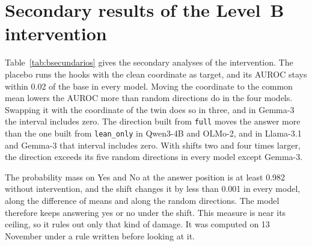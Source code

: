 \documentclass[10pt]{article}
\newcommand{\vr}[1]{\texttt{#1}}
\begin{document}
\section{Secondary results of the Level~B intervention}\label{app:intervencion}

Table~\ref{tab:bsecundarios} gives the secondary analyses of the intervention. The placebo runs the hooks with the
clean coordinate as target, and its AUROC stays within 0.02 of the base in every model. Moving the coordinate to the
common mean lowers the AUROC more than random directions do in the four models. Swapping it with the coordinate of the
twin does so in three, and in Gemma-3 the interval includes zero. The direction built from \vr{full} moves the answer
more than the one built from \vr{lean\_only} in Qwen3-4B and OLMo-2, and in Llama-3.1 and Gemma-3 that interval
includes zero. With shifts two and four times larger, the direction exceeds its five random directions in every model
except Gemma-3.

The probability mass on Yes and No at the answer position is at least 0.982 without intervention, and the shift
changes it by less than 0.001 in every model, along the difference of means and along the random directions. The model
therefore keeps answering yes or no under the shift. This measure is near its ceiling, so it rules out only that kind
of damage. It was computed on 13 November under a rule written before looking at it.
\end{document}

